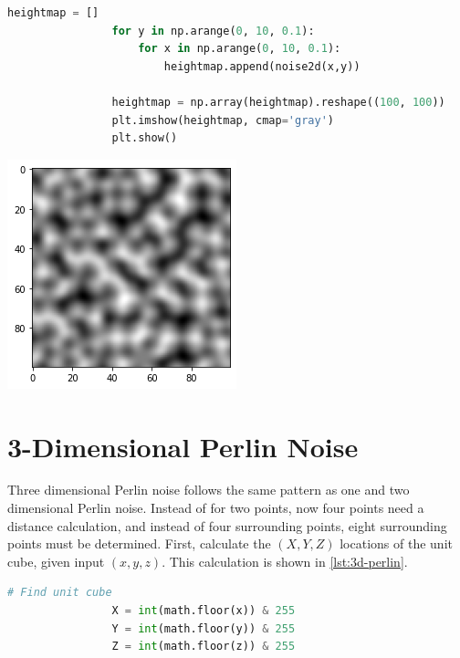 \documentclass[10pt]{report}
\begin{document}
			\begin{lstlisting}[label={lst:perlin2duse}, language=Python, frame=none, caption={Two dimensional example.}, captionpos=b]
				heightmap = []
				for y in np.arange(0, 10, 0.1):
					for x in np.arange(0, 10, 0.1):
						heightmap.append(noise2d(x,y))
						
				heightmap = np.array(heightmap).reshape((100, 100))
				plt.imshow(heightmap, cmap='gray')
				plt.show()
			\end{lstlisting}
			
			
			
			\begin{minipage}{\textwidth}
				\centering
				\includegraphics[scale=1.0]{2dperlin}
				\label{fig:lect14-perlin}
			\end{minipage} 
		
		\section{3-Dimensional Perlin Noise}
		
			Three dimensional Perlin noise follows the same pattern as one and two dimensional Perlin noise. Instead of for two points, now four points need a distance calculation, and instead of four surrounding points, eight surrounding points must be determined. First, calculate the \((X,Y,Z)\) locations of the unit cube, given input \((x,y,z)\). This calculation is shown in \autoref{lst:3d-perlin}.
			
			\begin{lstlisting}[label={lst:3d-perlin}, language=Python, frame=none, caption={Unit cube calculation.}, captionpos=b]
				# Find unit cube
				X = int(math.floor(x)) & 255
				Y = int(math.floor(y)) & 255
				Z = int(math.floor(z)) & 255
			\end{lstlisting}
			
\end{document}
